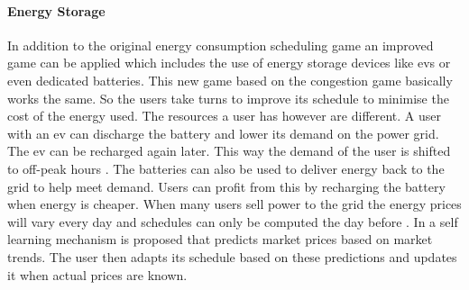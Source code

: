 \paragraph{Energy Storage}
In addition to the original energy consumption scheduling game an improved game can be applied which includes the use of energy storage devices like \acp{ev} or even dedicated batteries. This new game based on the congestion game basically works the same. So the users take turns to improve its schedule to minimise the cost of the energy used. The resources a user has however are different. A user with an \ac{ev} can discharge the battery and lower its demand on the power grid. The \ac{ev} can be recharged again later. This way the demand of the user is shifted to off-peak hours \cite{NguyenSongHan2012}. The batteries can also be used to deliver energy back to the grid to help meet demand. Users can profit from this by recharging the battery when energy is cheaper. When many users sell power to the grid the energy prices will vary every day and schedules can only be computed the day before \cite{VytelingumVoiceRamchurnEtAl2010}. In \cite{VytelingumVoiceRamchurnEtAl2010} a self learning mechanism is proposed that predicts market prices based on market trends. The user then adapts its schedule based on these predictions and updates it when actual prices are known.
